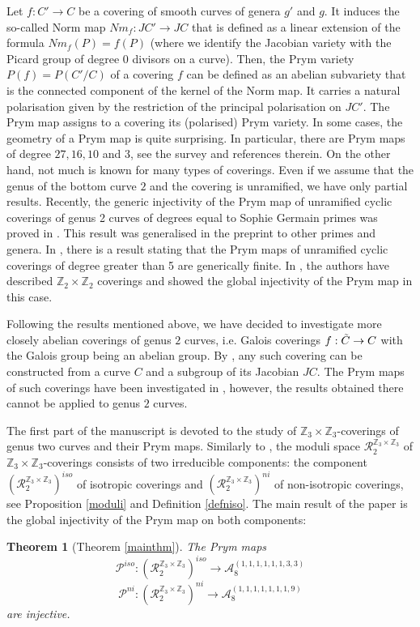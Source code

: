 \documentclass{amsart}
\newtheorem{thm}{Theorem}[section]
\theoremstyle{remark}
\numberwithin{equation}{section}
\newcommand{\ZZ}{\mathbb Z}
\newcommand{\cA}{\mathcal{A}}
\newcommand{\tC}{\Tilde{C}}
\begin{document}
Let $f:C'\to C$ be a covering of smooth curves of genera $g'$ and $g$. It induces the so-called Norm map $Nm_f:JC'\to JC$ that is defined as a linear extension of the formula $Nm_f(P)=f(P)$ (where we identify the Jacobian variety with the Picard group of degree \(0\) divisors on a curve). Then, the Prym variety $P(f) = P(C'/C)$ of a covering $f$ can be defined as an abelian subvariety that is the connected component of the kernel of the Norm map. It carries a natural polarisation given by the restriction of the principal polarisation on $JC'$. The Prym map assigns to a covering its (polarised) Prym variety. In some cases, the geometry of a Prym map is quite surprising. In particular, there are Prym maps of degree $27, 16, 10$ and $3$, see the survey \cite{Oams} and references therein. On the other hand, not much is known for many types of coverings. Even if we assume that the genus of the bottom curve $2$ and the covering is unramified, we have only partial results. Recently, the generic injectivity of the Prym map of unramified cyclic coverings of genus 2 curves of degrees equal to Sophie Germain primes was proved in \cite{sophie}. This result was generalised in the preprint \cite{naranjo2024simplicityjacobiansautomorphisms} to other primes and genera.
In \cite{Ago}, there is a result stating that the Prym maps of unramified cyclic coverings of degree greater than 5 are generically finite. In \cite{BO19}, the authors have described $\ZZ_2\times\ZZ_2$ coverings and showed the global injectivity of the Prym map in this case.

Following the results mentioned above, we have decided to investigate more closely abelian coverings of genus \(2\) curves, i.e. Galois coverings $f:\tC\to C$ with the Galois group being an abelian group. By \cite{Pardini}, any such covering can be constructed from a curve $C$ and a subgroup of its Jacobian $JC$. The Prym maps of such coverings have been investigated in \cite{Mohajer}, however, the results obtained there cannot be applied to genus \(2\) curves. 

The first part of the manuscript is devoted to the study of $\mathbb{Z}_3\times \mathbb{Z}_3$-coverings of genus two curves and their Prym maps. 
Similarly to \cite{BO19}, the moduli space $\mathcal{R}_2^{\mathbb{Z}_3\times \mathbb{Z}_3}$ of $\mathbb{Z}_3\times \mathbb{Z}_3$-coverings consists of two irreducible components: the component $(\mathcal{R}_2^{\mathbb{Z}_3\times \mathbb{Z}_3})^{iso}$ of isotropic coverings and $(\mathcal{R}_2^{\mathbb{Z}_3\times \mathbb{Z}_3})^{ni}$ of non-isotropic coverings, see Proposition \ref{moduli} and Definition \ref{defniso}. 
The main result of the paper is the global injectivity of the Prym map on both components:
\begin{thm}[Theorem \ref{mainthm}]
    The Prym maps $$\mathcal{P}^{iso}:(\mathcal{R}_2^{\mathbb{Z}_3\times \mathbb{Z}_3})^{iso} \to \cA^{(1,1,1,1,1,1,3,3)}_8$$ 
    $$\mathcal{P}^{ni}:(\mathcal{R}_2^{\mathbb{Z}_3\times \mathbb{Z}_3})^{ni} \to\cA^{(1,1,1,1,1,1,1,9)}_8$$
    are injective.
\end{thm}
\end{document}
